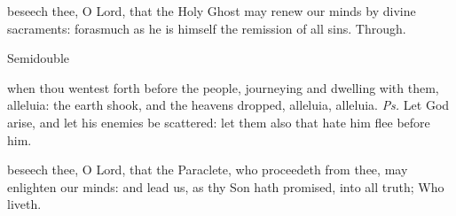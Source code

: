\postcommunion
{} beseech thee, O Lord, that the Holy Ghost may renew our minds by divine sacraments: forasmuch as he is himself the remission of all sins. Through.

\begin{inhead}
    {Semidouble}
\end{inhead}

\introit
{} when thou wentest forth before the people, journeying and dwelling with them, alleluia: the earth shook, and the heavens dropped, alleluia, alleluia. \textit{Ps.} Let God arise, and let his enemies be scattered: let them also that hate him flee before him.

\collect
{} beseech thee, O Lord, that the Paraclete, who proceedeth from thee, may enlighten our minds: and lead us, as thy Son hath promised, into all truth; Who liveth.

